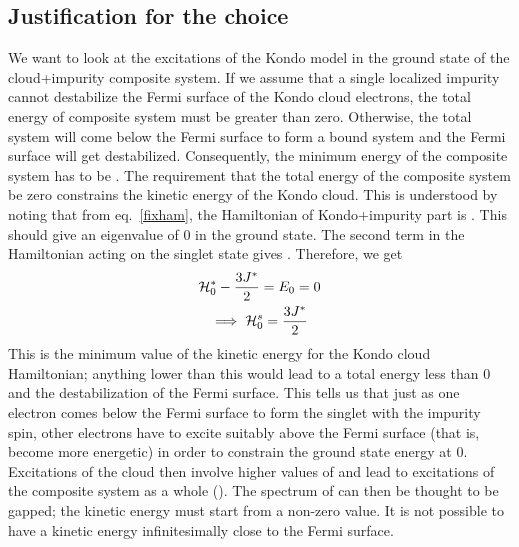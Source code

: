 \documentclass[14pt]{extarticle}
\numberwithin{equation}{section}
\begin{document}
{\subsection*{Justification for the choice }
We want to look at the excitations of the Kondo model in the ground state of the cloud+impurity composite system.
If we assume that a single localized impurity cannot destabilize the Fermi surface of the Kondo cloud electrons, the total energy of composite system must be greater than zero.
Otherwise, the total system will come below the Fermi surface to form a bound system and the Fermi surface will get destabilized.
Consequently, the minimum energy of the composite system has to be .
\pb
The requirement that the total energy of the composite system be zero constrains the kinetic energy of the Kondo cloud.
This is understood by noting that from eq.~\ref{fixham}, the Hamiltonian of Kondo+impurity part is .
This should give an eigenvalue of 0 in the ground state.
The second term in the Hamiltonian acting on the singlet state gives .
Therefore, we get
\begin{gather}
\mathcal{H}_0^* -\frac{3J^*}{2} = E_0 = 0 \\
\implies \mathcal{H}_0^s = \frac{3J^*}{2}
\end{gather}
This is the minimum value of the kinetic energy for the Kondo cloud Hamiltonian; anything lower than this would lead to a total energy  less than 0 and the destabilization of the Fermi surface.
This tells us that just as one electron comes below the Fermi surface to form the singlet with the impurity spin, other electrons have to excite suitably above the Fermi surface (that is, become more energetic) in order to constrain the ground state energy at 0.
Excitations of the cloud then involve higher values of  and lead to excitations of the composite system as a whole ().
The spectrum of  can then be thought to be gapped; the kinetic energy must start from a non-zero value.
It is not possible to have a kinetic energy infinitesimally close to the Fermi surface.
}
\end{document}
